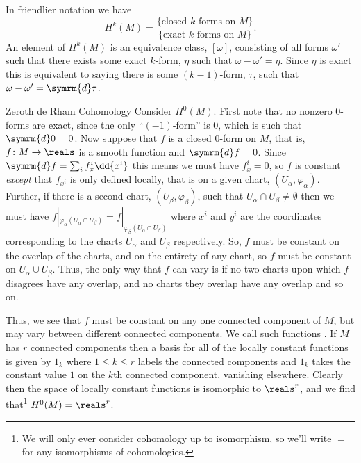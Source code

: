 \documentclass[fleqn]{NotesClass}
\renewcommand{\dl}{\symrm{d}}
\begin{document}
    In friendlier notation we have
    \begin{equation}
        H^k(M) = \frac{\{\text{closed \(k\)-forms on \(M\)}\}}{\{\text{exact \(k\)-forms on \(M\)}\}}.
    \end{equation}
    An element of \(H^k(M)\) is an equivalence class, \([\omega]\), consisting of all forms \(\omega'\) such that there exists some exact \(k\)-form, \(\eta\) such that \(\omega - \omega' = \eta\).
    Since \(\eta\) is exact this is equivalent to saying there is some \((k - 1)\)-form, \(\tau\), such that \(\omega - \omega' = \dl \tau\).
    
    \begin{exm}{Zeroth de Rham Cohomology}{}
        Consider \(H^0(M)\).
        First note that no nonzero \(0\)-forms are exact, since the only \enquote{\((-1)\)-form} is \(0\), which is such that \(\dl 0 = 0\).
        Now suppose that \(f\) is a closed \(0\)-form on \(M\), that is, \(f \colon M \to \reals\) is a smooth function and \(\dl f = 0\).
        Since \(\dl f = \sum_i f_x^i \dd{x^i}\) this means we must have \(f_x^i = 0\), so \(f\) is constant \emph{except} that \(f_{x^i}\) is only defined locally, that is on a given chart, \((U_\alpha, \varphi_\alpha)\).
        Further, if there is a second chart, \((U_\beta, \varphi_\beta)\), such that \(U_\alpha \cap U_\beta \ne \emptyset\) then we must have \(f|_{\varphi_\alpha(U_\alpha \cap U_\beta)} = f|_{\varphi_\beta(U_\alpha \cap U_\beta)}\) where \(x^i\) and \(y^i\) are the coordinates corresponding to the charts \(U_\alpha\) and \(U_\beta\) respectively.
        So, \(f\) must be constant on the overlap of the charts, and on the entirety of any chart, so \(f\) must be constant on \(U_\alpha \cup U_\beta\).
        Thus, the only way that \(f\) can vary is if no two charts upon which \(f\) disagrees have any overlap, and no charts they overlap have any overlap and so on.
        
        Thus, we see that \(f\) must be constant on any one connected component of \(M\), but may vary between different connected components.
        We call such functions .
        If \(M\) has \(r\) connected components then a basis for all of the locally constant functions is given by \(1_k\) where \(1 \le k \le r\) labels the connected components and \(1_k\) takes the constant value \(1\) on the \(k\)th connected component, vanishing elsewhere.
        Clearly then the space of locally constant functions is isomorphic to \(\reals^r\), and we find that\footnote{We will only ever consider cohomology up to isomorphism, so we'll write \(=\) for any isomorphisms of cohomologies.} \(H^0(M) = \reals^r\). 
    \end{exm}
    
\end{document}
